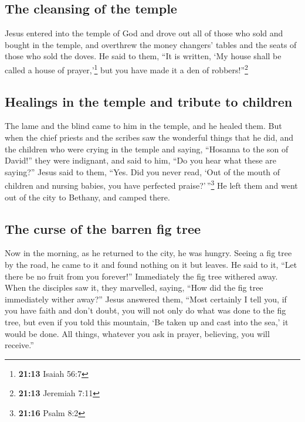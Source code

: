 \hypertarget{the-cleansing-of-the-temple}{%
\subsection{The cleansing of the
temple}\label{the-cleansing-of-the-temple}}

 Jesus entered into the temple of God and drove out all
of those who sold and bought in the temple, and overthrew the money
changers' tables and the seats of those who sold the doves.
 He said to them, ``It is written, `My house shall be
called a house of prayer,'\footnote{\textbf{21:13} Isaiah 56:7} but you
have made it a den of robbers!''\footnote{\textbf{21:13} Jeremiah 7:11}

\hypertarget{healings-in-the-temple-and-tribute-to-children}{%
\subsection{Healings in the temple and tribute to
children}\label{healings-in-the-temple-and-tribute-to-children}}

 The lame and the blind came to him in the temple, and he
healed them.  But when the chief priests and the scribes
saw the wonderful things that he did, and the children who were crying
in the temple and saying, ``Hosanna to the son of David!'' they were
indignant,  and said to him, ``Do you hear what these are
saying?'' Jesus said to them, ``Yes. Did you never read, `Out of the
mouth of children and nursing babies, you have perfected
praise?'\,''\footnote{\textbf{21:16} Psalm 8:2}  He left
them and went out of the city to Bethany, and camped there.

\hypertarget{the-curse-of-the-barren-fig-tree}{%
\subsection{The curse of the barren fig
tree}\label{the-curse-of-the-barren-fig-tree}}

 Now in the morning, as he returned to the city, he was
hungry.  Seeing a fig tree by the road, he came to it and
found nothing on it but leaves. He said to it, ``Let there be no fruit
from you forever!'' Immediately the fig tree withered away.
 When the disciples saw it, they marvelled, saying, ``How
did the fig tree immediately wither away?''  Jesus
answered them, ``Most certainly I tell you, if you have faith and don't
doubt, you will not only do what was done to the fig tree, but even if
you told this mountain, `Be taken up and cast into the sea,' it would be
done.  All things, whatever you ask in prayer, believing,
you will receive.''

